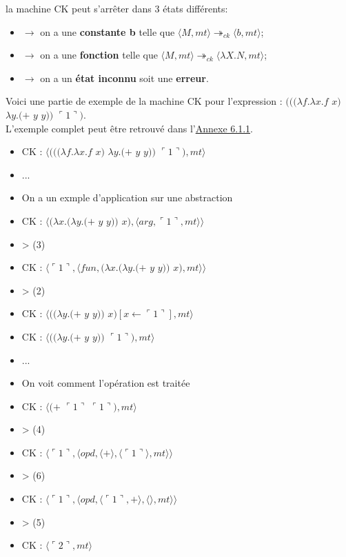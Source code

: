\documentclass[10pt,a4paper]{report}
\begin{document}
la machine CK peut s'arrêter dans 3 états différents:
\begin{itemize}
\item[]$\longrightarrow$ on a une \textbf{constante b} telle que $\langle M,mt\rangle \twoheadrightarrow_{ck} \langle b,mt\rangle$;
\item[]$\longrightarrow$ on a une \textbf{fonction} telle que $\langle M,mt\rangle \twoheadrightarrow_{ck} \langle\lambda X.N,mt\rangle$;
\item[]$\longrightarrow$ on a un \textbf{état inconnu} soit une \textbf{erreur}.
\end{itemize}
\bigbreak


Voici une partie de exemple de la machine CK pour l'expression : 
$(((\lambda f.\lambda x.f$ $x)$ $\lambda y.(+$ $y$ $y))$ $\ulcorner 1\urcorner)$.
\\ L'exemple complet peut être retrouvé dans l'\hyperref[CK]{Annexe 6.1.1}.

\begin{multicols}{2}\raggedright{
    \begin{itemize}
    \item[] CK : $\langle(((\lambda f.\lambda x.f$ $x)$ $\lambda y.(+$ $y$ $y))$ $\ulcorner 1\urcorner),mt\rangle$
    \item[] ...
    \item[] On a un exmple d'application sur une abstraction
    \item[] CK : $\langle(\lambda x.(\lambda y.(+$ $y$ $y))$ $x),\langle arg,\ulcorner 1\urcorner,mt\rangle\rangle$	
    \item[] > (3) 
    \item[] CK : $\langle\ulcorner 1\urcorner,\langle fun,(\lambda x.(\lambda y.(+$ $y$ $y))$ $x),mt\rangle\rangle$
    \item[] > (2) 
    \item[] CK : $\langle((\lambda y.(+$ $y$ $y))$ $x)[x \leftarrow \ulcorner 1\urcorner ],mt\rangle$
    \item[] CK : $\langle((\lambda y.(+$ $y$ $y))$ $\ulcorner 1\urcorner),mt\rangle$
    \end{itemize}
    
    \begin{itemize}
    \item[] ...
    \item[] On voit comment l'opération est traitée
    \item[] CK : $\langle(+$ $\ulcorner 1\urcorner$ $\ulcorner 1\urcorner),mt\rangle$
    \item[] > (4)
    \item[] CK : $\langle\ulcorner 1\urcorner,\langle opd,\langle + \rangle,\langle\ulcorner 1\urcorner\rangle,mt\rangle\rangle$
    \item[] > (6) 
    \item[] CK : $\langle\ulcorner 1\urcorner,\langle opd,\langle\ulcorner 1\urcorner,+ \rangle,\langle\rangle,mt\rangle\rangle$
    \item[] > (5) 
    \item[] CK : $\langle\ulcorner 2\urcorner,mt\rangle$
    \end{itemize}
  }
\end{multicols}
\end{document}
